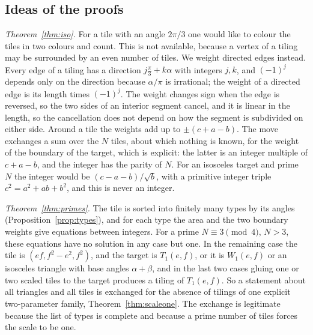 \documentclass[11pt,reqno]{amsart}
\theoremstyle{plain}
\theoremstyle{definition}
\begin{document}
\subsection{Ideas of the proofs}\label{sub:ideas}

\emph{Theorem~\ref{thm:iso}.} For a tile with an angle $2\pi/3$ one would like to colour the tiles in two
colours and count. This is not available, because a vertex of a tiling may be surrounded by an even number
of tiles. We weight directed edges instead. Every edge of a tiling has a direction $j\frac\pi3+k\alpha$ with
integers $j,k$, and $(-1)^j$ depends only on the direction because $\alpha/\pi$ is irrational; the weight of
a directed edge is its length times $(-1)^j$. The weight changes sign when the edge is reversed, so the two
sides of an interior segment cancel, and it is linear in the length, so the cancellation does not depend on
how the segment is subdivided on either side. Around a tile the weights add up to $\pm(c+a-b)$. The move
exchanges a sum over the $N$ tiles, about which nothing is known, for the weight of the boundary of the
target, which is explicit: the latter is an integer multiple of $c+a-b$, and the integer has the parity of
$N$. For an isosceles target and prime $N$ the integer would be $(c-a-b)/\sqrt b$, with a primitive integer
triple $c^2=a^2+ab+b^2$, and this is never an integer.

\emph{Theorem~\ref{thm:primes}.} The tile is sorted into finitely many types by its angles
(Proposition~\ref{prop:types}), and for each type the area and the two boundary weights give equations
between integers. For a prime $N\equiv3\pmod4$, $N>3$, these equations have no solution in any case but
one. In the remaining case the tile is $(ef,f^2-e^2,f^2)$, and the target is $T_1(e,f)$, or it is $W_1(e,f)$
or an isosceles triangle with base angles $\alpha+\beta$, and in the last two cases gluing one or two scaled
tiles to the target produces a tiling of $T_1(e,f)$. So a statement about all triangles and all tiles is
exchanged for the absence of tilings of one explicit two-parameter family, Theorem~\ref{thm:scaleone}. The
exchange is legitimate because the list of types is complete and because a prime number of tiles forces the
scale to be one.
\end{document}
